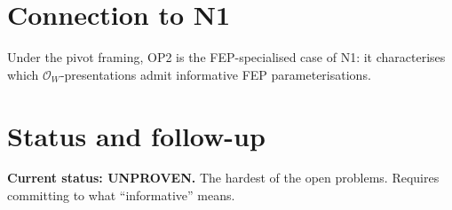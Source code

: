 \documentclass[11pt]{article}
\theoremstyle{plain}
\theoremstyle{definition}
\begin{document}
\section{Connection to N1}

Under the pivot framing, OP2 is the FEP-specialised case of N1: it
characterises which $\mathcal{O}_W$-presentations admit informative
FEP parameterisations.

\section{Status and follow-up}

\textbf{Current status: UNPROVEN.} The hardest of the open problems.
Requires committing to what ``informative'' means.



\end{document}
